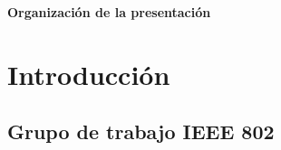 \documentclass[aspectratio=169, handout]{beamer}
\begin{document}

\begin{frame}{\textbf{Organización de la presentación}}
  \tableofcontents
\end{frame}
%
%

\section{Introducción}

\subsection[IEEE 802]{Grupo de trabajo IEEE 802}
\end{document}
